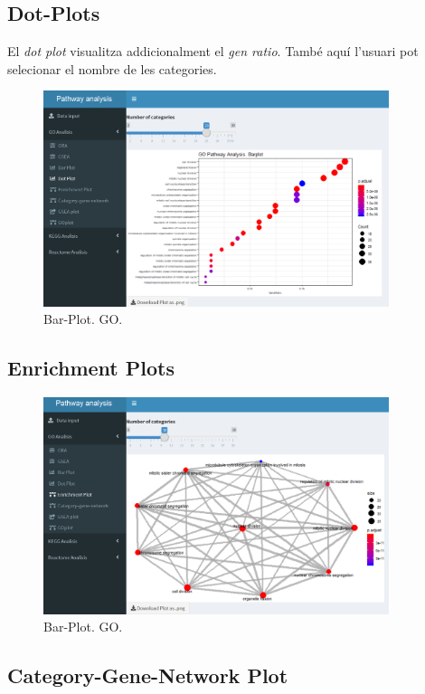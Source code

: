 \documentclass[]{article}
\begin{document}
\subsection{Dot-Plots}

El \textit{dot plot} visualitza addicionalment el \textit{gen ratio}. També aquí l'usuari pot selecionar el nombre de les categories.


\begin{figure}[H]
\centering
\includegraphics[width=0.9\textwidth]{App_F15_Items_GO_DotPlot.png}  
\caption{Bar-Plot. GO.}
\end{figure}

\subsection{Enrichment Plots}

\begin{figure}[H]
\centering
\includegraphics[width=0.9\textwidth]{App_F16_Items_GO_Emap.png}  
\caption{Bar-Plot. GO.}
\end{figure}

\subsection{Category-Gene-Network Plot}
\end{document}

